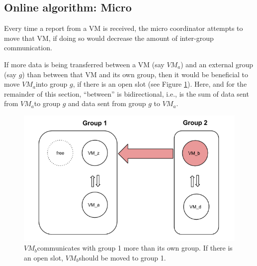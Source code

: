 \documentclass[11pt]{article}
\begin{document}
\subsection{Online algorithm: Micro}
\newcommand{\VMa}{$\textit{VM}_a$}
\newcommand{\VMb}{$\textit{VM}_b$}
Every time a report from a VM is received, the micro coordinator attempts to move that VM, if doing so would decrease the amount of inter-group communication.

If more data is being transferred between a VM (say \VMa) and an external group (say $g$) than between that VM and its own group, then it would be beneficial to move \VMa into group $g$, if there is an open slot (see Figure \ref{fig:micro-move}).  Here, and for the remainder of this section, ``between'' is bidirectional, i.e., is the sum of data sent from \VMa to group $g$ and data sent from group $g$ to \VMa.

\begin{figure}
  \centering
\includegraphics[scale=0.65]{micro1.png}

 \caption{\VMb communicates with group 1 more than its own group.  If there is an open slot, \VMb should be moved to group 1.}

 \label{fig:micro-move}
 
\end{figure}
\end{document}
